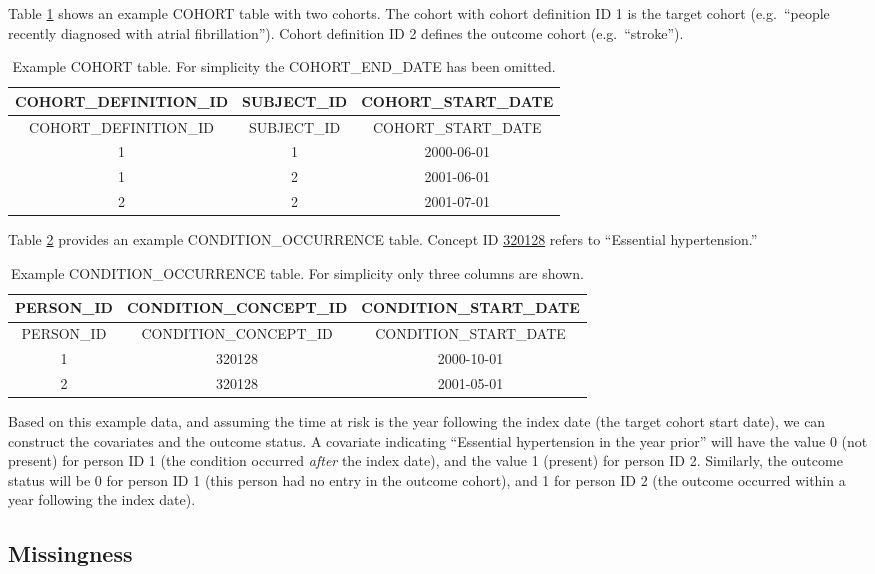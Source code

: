 \documentclass[11pt]{book}
\theoremstyle{definition}
\theoremstyle{definition}
\theoremstyle{definition}
\theoremstyle{remark}
\begin{document}
Table \ref{tab:plpExampleCohorts} shows an example COHORT table with two cohorts. The cohort with cohort definition ID 1 is the target cohort (e.g.~``people recently diagnosed with atrial fibrillation''). Cohort definition ID 2 defines the outcome cohort (e.g.~``stroke'').

\begin{longtable}[]{@{}ccc@{}}
\caption{\label{tab:plpExampleCohorts} Example COHORT table. For simplicity the COHORT\_END\_DATE has been omitted.}\tabularnewline
\toprule
COHORT\_DEFINITION\_ID & SUBJECT\_ID & COHORT\_START\_DATE\tabularnewline
\midrule
\endfirsthead
\toprule
COHORT\_DEFINITION\_ID & SUBJECT\_ID & COHORT\_START\_DATE\tabularnewline
\midrule
\endhead
1 & 1 & 2000-06-01\tabularnewline
1 & 2 & 2001-06-01\tabularnewline
2 & 2 & 2001-07-01\tabularnewline
\bottomrule
\end{longtable}

Table \ref{tab:plpExampleConditions} provides an example CONDITION\_OCCURRENCE table. Concept ID \href{http://athena.ohdsi.org/search-terms/terms/320128}{320128} refers to ``Essential hypertension.''

\begin{longtable}[]{@{}ccc@{}}
\caption{\label{tab:plpExampleConditions} Example CONDITION\_OCCURRENCE table. For simplicity only three columns are shown.}\tabularnewline
\toprule
PERSON\_ID & CONDITION\_CONCEPT\_ID & CONDITION\_START\_DATE\tabularnewline
\midrule
\endfirsthead
\toprule
PERSON\_ID & CONDITION\_CONCEPT\_ID & CONDITION\_START\_DATE\tabularnewline
\midrule
\endhead
1 & 320128 & 2000-10-01\tabularnewline
2 & 320128 & 2001-05-01\tabularnewline
\bottomrule
\end{longtable}

Based on this example data, and assuming the time at risk is the year following the index date (the target cohort start date), we can construct the covariates and the outcome status. A covariate indicating ``Essential hypertension in the year prior'' will have the value 0 (not present) for person ID 1 (the condition occurred \emph{after} the index date), and the value 1 (present) for person ID 2. Similarly, the outcome status will be 0 for person ID 1 (this person had no entry in the outcome cohort), and 1 for person ID 2 (the outcome occurred within a year following the index date).

\hypertarget{missingness}{%
\subsection{Missingness}\label{missingness}}
\end{document}
